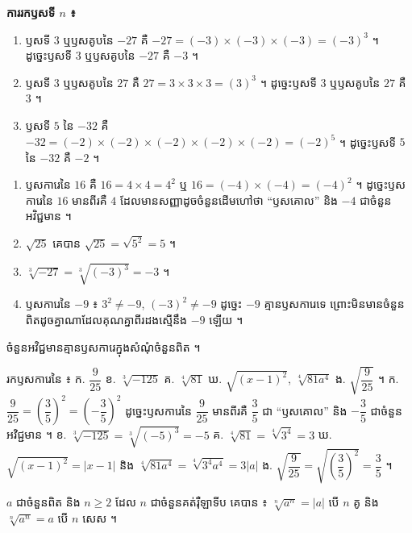 \textbf{ការរកឫសទី $n$ ៖}
\begin{example}[ឧទាហរណ៍ ១]
\begin{enumerate}[a]
  \item ឫសទី $3$ ឬឫសគូបនៃ $-27$ គឺ $-27 = (-3)\times(-3)\times(-3) = (-3)^3$ ។ ដូច្នេះឫសទី $3$ ឬឫសគូបនៃ $-27$ គឺ $-3$ ។
  \item ឫសទី $3$ ឬឫសគូបនៃ $27$ គឺ $27 = 3\times 3\times 3 = (3)^3$ ។ ដូច្នេះឫសទី $3$ ឬឫសគូបនៃ $27$ គឺ $3$ ។
  \item ឫសទី $5$ នៃ $-32$ គឺ $-32 = (-2)\times(-2)\times(-2)\times(-2)\times(-2) = (-2)^5$ ។ ដូច្នេះឫសទី $5$ នៃ $-32$ គឺ $-2$ ។
\end{enumerate}
\end{example}
\begin{example}[ឧទាហរណ៍ ២]
\begin{enumerate}[a]
  \item ឫសការេនៃ $16$ គឺ $16 = 4\times 4 = 4^2$ ឬ $16 = (-4)\times(-4) = (-4)^2$ ។ ដូច្នេះឫសការេនៃ $16$ មានពីរគឺ $4$ ដែលមានសញ្ញាដូចចំនួនដើមហៅថា “ឫសគោល” និង $-4$ ជាចំនួនអវិជ្ជមាន ។
  \item $\sqrt{25}$ គេបាន $\sqrt{25} = \sqrt{5^2} = 5$ ។
  \item $\sqrt[3]{-27} = \sqrt[3]{(-3)^3} = -3$ ។
  \item ឫសការេនៃ $-9$ ៖ $3^2 \ne -9$, $(-3)^2 \ne -9$ ដូច្នេះ $-9$ គ្មានឫសការេទេ ព្រោះមិនមានចំនួនពិតដូចគ្នាណាដែលគុណគ្នាពីរដងស្មើនឹង $-9$ ឡើយ ។
\end{enumerate}
\end{example}
\begin{formulaBox}[ជាទូទៅ]
ចំនួនអវិជ្ជមានគ្មានឫសការេក្នុងសំណុំចំនួនពិត ។
\end{formulaBox}

\begin{example}[លំហាត់គំរូ]
រកឫសការេនៃ ៖ \quad ក. $\dfrac{9}{25}$ \quad ខ. $\sqrt[3]{-125}$ \quad គ. $\sqrt[4]{81}$ \quad ឃ. $\sqrt{(x-1)^2}$, $\sqrt[4]{81a^4}$ \quad ង. $\sqrt{\dfrac{9}{25}}$ ។
\ans
ក. $\dfrac{9}{25} = \left(\dfrac{3}{5}\right)^2 = \left(-\dfrac{3}{5}\right)^2$ ដូច្នេះឫសការេនៃ $\dfrac{9}{25}$ មានពីរគឺ $\dfrac{3}{5}$ ជា “ឫសគោល” និង $-\dfrac{3}{5}$ ជាចំនួនអវិជ្ជមាន ។ \quad ខ. $\sqrt[3]{-125} = \sqrt[3]{(-5)^3} = -5$ \quad គ. $\sqrt[4]{81} = \sqrt[4]{3^4} = 3$ \quad ឃ. $\sqrt{(x-1)^2} = |x - 1|$ និង $\sqrt[4]{81a^4} = \sqrt[4]{3^4a^4} = 3|a|$ \quad ង. $\sqrt{\dfrac{9}{25}} = \sqrt{\left(\dfrac{3}{5}\right)^2} = \dfrac{3}{5}$ ។
\end{example}

\begin{formulaBox}[ជាទូទៅ]
$a$ ជាចំនួនពិត និង $n \ge 2$ ដែល $n$ ជាចំនួនគត់រ៉ឺឡាទីប គេបាន ៖ $\sqrt[n]{a^n} = |a|$ បើ $n$ គូ និង $\sqrt[n]{a^n} = a$ បើ $n$ សេស ។
\end{formulaBox}


